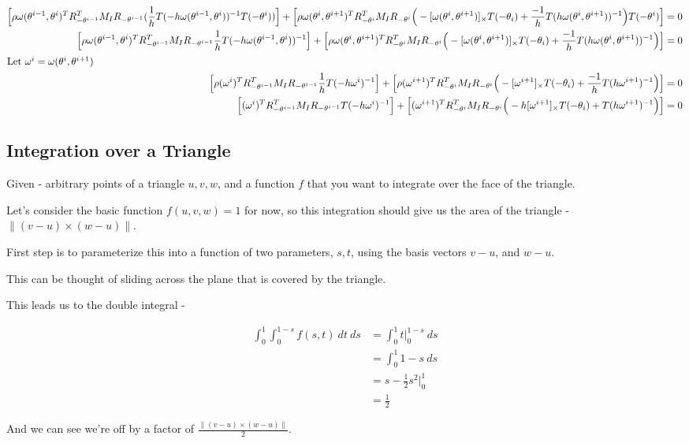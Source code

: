 \documentclass[landscape]{article}
\theoremstyle{definition}
\begin{document}
\begin{align*}
    \Big[ \rho \omega(\theta^{i-1}, \theta^{i})^T R_{-\theta^{i-1}}^T M_I R_{-\theta^{i-1}} (\frac{1}{h} T(-h \omega(\theta^{i-1}, \theta^{i}))^{-1} T(- \theta^{i}) ) \Big] + \Big[ \rho \omega(\theta^i, \theta^{i+1})^T R_{-\theta^i}^T M_I R_{-\theta^i} \Big( -[\omega(\theta^i, \theta^{i+1})]_{\times} T(-\theta_i) +  \frac{-1}{h} T(h \omega(\theta^i, \theta^{i+1}))^{-1} \Big) T(-\theta^i) \Big] &= 0 \\
    \Big[ \rho \omega(\theta^{i-1}, \theta^{i})^T R_{-\theta^{i-1}}^T M_I R_{-\theta^{i-1}} \frac{1}{h} T(-h \omega(\theta^{i-1}, \theta^{i}))^{-1} \Big] + \Big[ \rho \omega(\theta^i, \theta^{i+1})^T R_{-\theta^i}^T M_I R_{-\theta^i} \Big(- [\omega(\theta^i, \theta^{i+1})]_{\times} T(-\theta_i) + \frac{-1}{h} T(h \omega(\theta^i, \theta^{i+1}))^{-1} \Big) \Big] &= 0 \\
    \intertext{Let $\omega^i = \omega(\theta^i, \theta^{i+1})$}
    \Big[ \rho (\omega^i)^T R_{-\theta^{i-1}}^T M_I R_{-\theta^{i-1}} \frac{1}{h} T(-h \omega^i)^{-1} \Big] + \Big[ \rho (\omega^{i+1})^T R_{-\theta^i}^T M_I R_{-\theta^i} \Big( -[\omega^{i+1}]_{\times} T(-\theta_i) + \frac{-1}{h} T(h \omega^{i+1})^{-1} \Big) \Big] &= 0 \\
    \Big[ (\omega^i)^T R_{-\theta^{i-1}}^T M_I R_{-\theta^{i-1}} T(-h \omega^i)^{-1} \Big] + \Big[ (\omega^{i+1})^T R_{-\theta^i}^T M_I R_{-\theta^i} \Big( -h [\omega^{i+1}]_{\times} T(-\theta_i) + T(h \omega^{i+1})^{-1} \Big) \Big] &= 0 \\
\end{align*}

\subsection{Integration over a Triangle}

Given - arbitrary points of a triangle $u, v, w$, and a function $f$ that you want to integrate over the face of the triangle.

Let's consider the basic function $f(u, v, w) = 1$ for now, so this integration should give us the area of the triangle - $\| (v - u) \times (w - u) \|$.

First step is to parameterize this into a function of two parameters, $s, t$, using the basis vectors $v-u$, and $w-u$.

This can be thought of sliding across the plane that is covered by the triangle.

This leads us to the double integral -

\begin{center}
\end{center}

\begin{align*}
\int_0^1 \int_0^{1-s} f(s, t)\ dt\ ds
    &= \int_0^1 t |_0^{1-s}\ ds \\
    &= \int_0^1 1 - s\ ds \\
    &= s - \frac{1}{2}s^2 |_0^1 \\
    &= \frac{1}{2}
\end{align*}

And we can see we're off by a factor of $\frac{\|(v - u) \times (w - u)\|}{2}$.
\end{document}
